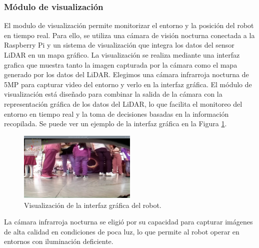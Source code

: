     \subsubsection{M\'odulo de visualizaci\'on} %
    \label{ssub:modvis}
    El modulo de visualizaci\'on permite monitorizar el entorno y la posici\'on del robot en
        tiempo real. Para ello, se utiliza una c\'amara de visi\'on nocturna conectada a la
        Raspberry Pi y un sistema de visualizaci\'on que integra los datos del sensor LiDAR en
        un mapa gr\'afico. La visualizaci\'on se realiza mediante una interfaz grafica que muestra
        tanto la imagen capturada por la c\'amara como el mapa generado por los datos del
        LiDAR.
    \vskip 0.5cm
    Elegimos una c\'amara infrarroja nocturna de 5MP para capturar video del entorno y
        verlo en la interfaz gr\'afica.
    \vskip 0.5cm
    El m\'odulo de visualizaci\'on est\'a dise\~nado para combinar la salida de la c\'amara con la
        representaci\'on gr\'afica de los datos del LiDAR, lo que facilita el monitoreo del entorno
        en tiempo real y la toma de decisiones basadas en la informaci\'on recopilada. Se puede ver un 
        ejemplo de la interfaz gr\'afica en la Figura \ref{fig:robot02}.
    \vskip 0.5cm
    \begin{figure}[htbp]
        \centering
        \includegraphics[width=0.5\textwidth]{./images/Pruebas/robot/robot02.jpeg}
        \caption{Visualizaci\'on de la interfaz gr\'afica del robot.}
        \label{fig:robot02}
    \end{figure}
    La c\'amara infrarroja nocturna se eligi\'o por su capacidad para capturar im\'agenes de alta
        calidad en condiciones de poca luz, lo que permite al robot operar en entornos con
        iluminaci\'on deficiente.
    \vskip 0.5cm
